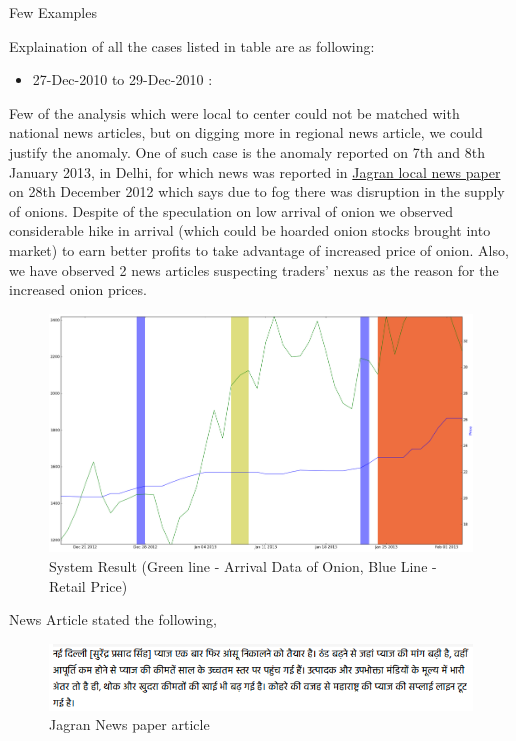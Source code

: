 \documentclass[a4paper,10pt]{article}
\begin{document}
\begin{table}[H]
\caption{Few Examples}
\label{examples}

\end{table}

Explaination of all the cases listed in table are as following:

\begin{itemize}
 \item 27-Dec-2010 to 29-Dec-2010 : 
\end{itemize}


Few of the analysis which were local to center could not be matched with national news articles, but on digging more in regional news article, we could justify the anomaly. One of such case is the anomaly reported on 7th and 8th January 2013, in Delhi, for which news was reported in \href{http://www.jagran.com/news/business-onion-price-affected-from-fog-9987751.html}{Jagran local news paper} on 28th December 2012 which says due to fog there was disruption in the supply of onions. Despite of the speculation on low arrival of onion we observed considerable hike in arrival (which could be hoarded onion stocks brought into market) to earn better profits to take advantage of increased price of onion. Also, we have observed 2 news articles suspecting traders' nexus as the reason for the increased onion prices.


			\begin{figure}[H]
		    	\centering
  		    	\includegraphics[width=1.1\textwidth]{graphs/localDelhiRegionalNewsPlusNexus.png}
		    	\caption{System Result (Green line - Arrival Data of Onion, Blue Line - Retail Price)}
		    	\label{fig:localExample}
			\end{figure}
			
News Article stated the following,

		\begin{figure}[H]
		    	\centering
  		    	\includegraphics[width=1.1\textwidth]{graphs/localDelhiFog.png}
		    	\caption{Jagran News paper article}
		    	\label{fig:localDelhiFog}
		\end{figure}
\end{document}
